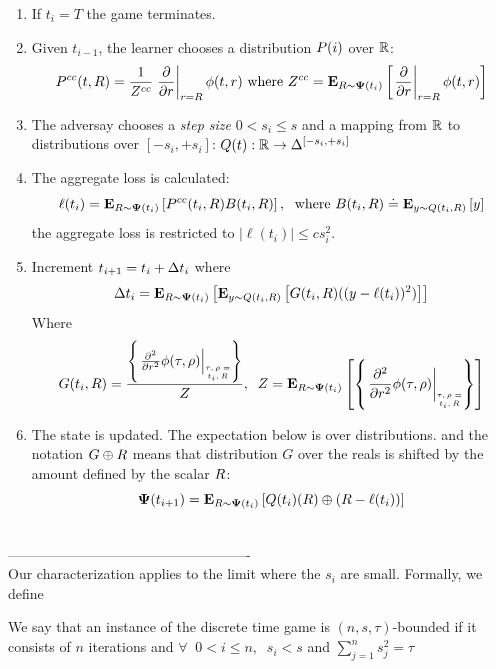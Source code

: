 \documentclass{article}[12pt]
\begin{document}
\begin{enumerate}
\item  If $t_i=T$ the game terminates.
\item Given $t_{i-1}$, the learner chooses a distribution
  $P(i)$ over $\mathbb{R}$:
  \begin{equation} \label{eqn:learner-strat-cc}
  P^{cc}(t,R) =  \frac{1}{Z^{cc}}
  \left. \frac{\partial}{\partial r} \right|_{r=R} \phi(t,r)
  \mbox{ where } Z^{cc} = {\bf E}_{R \sim {\bf \Psi}(t_i)}\left[ \left. \frac{\partial}{\partial r} \right|_{r=R} \phi(t,r) \right]
\end{equation}

\item The adversay chooses a {\em step size} $0<s_i\leq s$ and a mapping from $\mathbb{R}$ to distributions
  over $[-s_i,+s_i]$: $Q(t): \mathbb{R} \to \Delta^{[-s_i,+s_i]}$
\item The aggregate loss is calculated:
  \begin{equation} \label{eqn:ell-discrete}
    \ell(t_i)={\bf E}_{R \sim {\bf \Psi}(t_i)}\left[ P^{cc}(t_i,R)
      B(t_i,R) \right],\;\mbox{ where } B(t_i,R) \doteq {\bf E}_{y \sim Q(t_i,R)}\left[ y \right]
  \end{equation}
  the aggregate loss is restricted to $|\ell(t_i)| \leq c s_i^2$.
\item  Increment $t_{i+1} = t_{i} + \Delta t_i$ where
\begin{equation} \label{eqn:deltat}
  \Delta t_i=
  {\bf E}_{R \sim {\bf \Psi}(t_i)}\left[ {\bf E}_{y \sim
      Q(t_i,R)}\left[ G(t_i,R)
      ((y-\ell(t_i))^2) \right] \right]
\end{equation}
Where
\begin{equation} \label{eqn:SecondOrderDerivative}
G(t_i,\R) = \frac{\at{\frac{\partial^2}{\partial r^2}}}{Z},\;\;
Z=\E{\R \sim \state(t_i)}{\at{\frac{\partial^2}{\partial r^2}}}
\end{equation}

\item The state is updated. The expectation below is over
  distributions. and the notation $G \oplus R$ means
  that distribution $G$ over the reals is shifted by the amount
  defined by the scalar $R$:
  $${\bf \Psi}(t_{i+1}) = {\bf E}_{R \sim {\bf \Psi}(t_{i})}\left[ Q(t_i)(R)\oplus (R-\ell(t_i)) \right]
  $$
\end{enumerate}

~\\
----------------------------------------------------
~\\

Our characterization applies to the limit where the $s_i$ are small. Formally, we define
\begin{definition}
We say that an instance of the discrete time game is
$(n,s,\tau)$-bounded if it consists of $n$ iterations and $\forall\;\; 0<i\leq n,\;\; s_i < s$ and $\sum_{j=1}^n s_j^2=\tau$
\end{definition}
\end{document}
